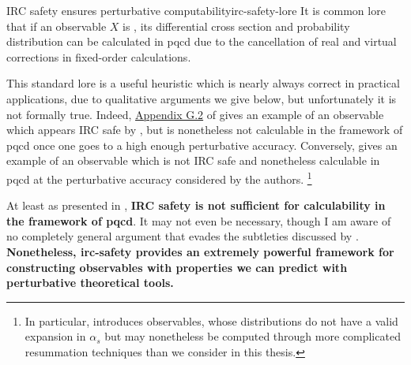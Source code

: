 


\begin{lore}{IRC safety ensures perturbative computability}{irc-safety-lore}
    It is common lore that if an observable \(X\) is , its differential cross section and probability distribution can be calculated in \gls{pqcd} due to the cancellation of real and virtual corrections in fixed-order calculations.
\end{lore}

    This standard lore is a useful heuristic which is nearly always correct in practical applications, due to qualitative arguments we give below, but unfortunately it is not formally true.
    Indeed, \href{https://arxiv.org/pdf/hep-ph/0407286\#page=94}{Appendix G.2} of  gives an example of an observable which appears IRC safe by , but is nonetheless not calculable in the framework of \gls{pqcd} once one goes to a high enough perturbative accuracy.
    Conversely,  gives an example of an observable which is not IRC safe and nonetheless calculable in \gls{pqcd} at the perturbative accuracy considered by the authors.%
    \footnote{
        In particular,  introduces  observables, whose distributions do not have a valid expansion in \(\alpha_s\) but may nonetheless be computed through more complicated resummation techniques than we consider in this thesis.
    }

    At least as presented in , \textbf{IRC safety is not sufficient for calculability in the framework of \gls{pqcd}}.
    It may not even be necessary, though I am aware of no  completely general argument that evades the subtleties discussed by .
    \textbf{Nonetheless, \gls{irc-safety} provides an extremely powerful framework for constructing observables with properties we can predict with perturbative theoretical tools.}


